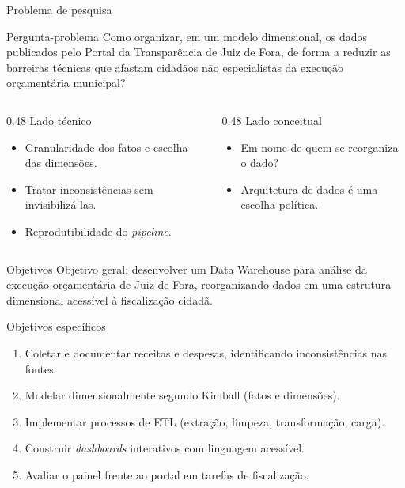 \documentclass[aspectratio=169]{beamer}
\begin{document}
\begin{frame}{Problema de pesquisa}
  \begin{block}{Pergunta-problema}
    Como organizar, em um modelo dimensional, os dados publicados pelo Portal da Transparência de Juiz de Fora, de forma a reduzir as barreiras técnicas que afastam cidadãos não especialistas da execução orçamentária municipal?
  \end{block}
  \begin{columns}[T]
    \begin{column}{0.48\textwidth}
      Lado técnico
      \begin{itemize}\small
        \item Granularidade dos fatos e escolha das dimensões.
        \item Tratar inconsistências sem invisibilizá-las.
        \item Reprodutibilidade do \textit{pipeline}.
      \end{itemize}
    \end{column}
    \begin{column}{0.48\textwidth}
      Lado conceitual
      \begin{itemize}\small
        \item Em nome de quem se reorganiza o dado?
        \item Arquitetura de dados é uma escolha política.
      \end{itemize}
    \end{column}
  \end{columns}
\end{frame}

\begin{frame}{Objetivos}
  Objetivo geral: desenvolver um Data Warehouse para análise da execução orçamentária de Juiz de Fora, reorganizando dados em uma estrutura dimensional acessível à fiscalização cidadã.
  \begin{block}{Objetivos específicos}
    \begin{enumerate}\small
      \item Coletar e documentar receitas e despesas, identificando inconsistências nas fontes.
      \item Modelar dimensionalmente segundo Kimball (fatos e dimensões).
      \item Implementar processos de ETL (extração, limpeza, transformação, carga).
      \item Construir \textit{dashboards} interativos com linguagem acessível.
      \item Avaliar o painel frente ao portal em tarefas de fiscalização.
    \end{enumerate}
  \end{block}
\end{frame}
\end{document}
